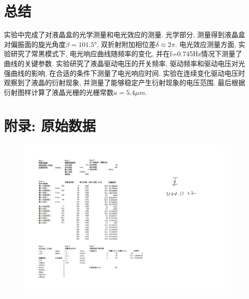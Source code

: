 \documentclass[12pt,a4paper]{article}
\begin{document}
\section{总结}
实验中完成了对液晶盒的光学测量和电光效应的测量. 光学部分, 测量得到液晶盒对偏振面的旋光角度$\beta=101.5°$, 双折射附加相位差$\delta \approx 2\pi$. 电光效应测量方面, 实验研究了常黑模式下, 电光响应曲线随频率的变化, 并在f=0.745Hz情况下测量了
曲线的关键参数. 实验研究了液晶驱动电压的开关频率, 驱动频率和驱动电压对光强曲线的影响, 在合适的条件下测量了电光响应时间. 实验在连续变化驱动电压时观察到了液晶的衍射现象, 并测量了能够稳定产生衍射现象的电压范围. 最后根据衍射图样计算了液晶光栅的光栅常数$a=5.4\mu m$. 

\section{附录: 原始数据}
\begin{figure}[H]
    \centering
    \includegraphics[width=1.5\textwidth, angle=90]{Raw.jpg}
\end{figure}
\end{document}
